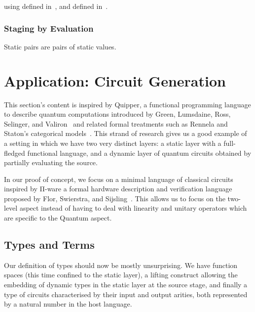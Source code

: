\documentclass{article}
\begin{document}



using  defined in~,
and  defined in~.

\subsubsection{Staging by Evaluation}

Static pairs are pairs of static values.



\section{Application: Circuit Generation}

This section's content is inspired by Quipper, a functional
programming language to describe quantum computations
introduced by Green, Lumsdaine, Ross, Selinger, and
Valiron~\cite{DBLP:conf/rc/GreenLRSV13} and related
formal treatments such as Rennela and Staton's categorical
models~\cite{DBLP:journals/lmcs/RennelaS19}.
%
This strand of research gives us a good example of a setting in which
we have two very distinct layers: a static layer with a
full-fledged functional language, and a dynamic layer of
quantum circuits obtained by partially evaluating the source.

In our proof of concept, we focus on a minimal language of
classical circuits inspired by Π-ware a formal hardware
description and verification language proposed by
Flor, Swierstra, and Sijsling~\cite{DBLP:conf/types/FlorSS15}.
%
This allows us to focus on the two-level aspect instead of
having to deal with linearity and unitary operators which are
specific to the Quantum aspect.

\subsection{Types and Terms}

Our definition of types should now be mostly unsurprising.
We have function spaces (this time confined to the static
layer), a lifting construct allowing the embedding of
dynamic types in the static layer at the source stage,
and finally a type of circuits characterised by their input
and output arities, both represented by a natural number in
the host language.
\end{document}
